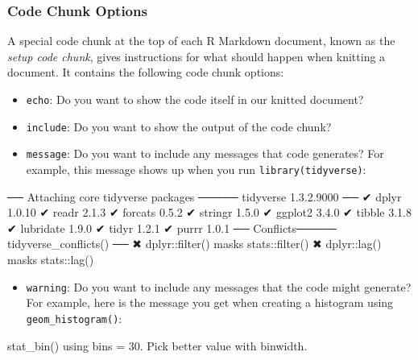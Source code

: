 \documentclass[
]{book}
\newenvironment{Shaded}{\begin{snugshade}}{\end{snugshade}}
\newcommand{\NormalTok}[1]{#1}
\providecommand{\tightlist}{%
  \setlength{\itemsep}{0pt}\setlength{\parskip}{0pt}}
\begin{document}
\hypertarget{code-chunk-options}{%
\subsubsection*{Code Chunk Options}\label{code-chunk-options}}

A special code chunk at the top of each R Markdown document, known as the \emph{setup code chunk}, gives instructions for what should happen when knitting a document. It contains the following code chunk options:

\begin{itemize}
\item
  \texttt{echo}: Do you want to show the code itself in our knitted document?
\item
  \texttt{include}: Do you want to show the output of the code chunk?
\item
  \texttt{message}: Do you want to include any messages that code generates? For example, this message shows up when you run \texttt{library(tidyverse)}:
\end{itemize}

\begin{Shaded}
\begin{Highlighting}[]
\NormalTok{── Attaching core tidyverse packages ───── tidyverse 1.3.2.9000 ──}
\NormalTok{✔ dplyr     1.0.10     ✔ readr     2.1.3 }
\NormalTok{✔ forcats   0.5.2      ✔ stringr   1.5.0 }
\NormalTok{✔ ggplot2   3.4.0      ✔ tibble    3.1.8 }
\NormalTok{✔ lubridate 1.9.0      ✔ tidyr     1.2.1 }
\NormalTok{✔ purrr     1.0.1      }
\NormalTok{── Conflicts───── tidyverse\_conflicts() ──}
\NormalTok{✖ dplyr::filter() masks stats::filter()}
\NormalTok{✖ dplyr::lag()    masks stats::lag()}
\end{Highlighting}
\end{Shaded}

\begin{itemize}
\tightlist
\item
  \texttt{warning}: Do you want to include any messages that the code might generate? For example, here is the message you get when creating a histogram using \texttt{geom\_histogram()}:
\end{itemize}

\begin{Shaded}
\begin{Highlighting}[]
\NormalTok{\textasciigrave{}stat\_bin()\textasciigrave{} using \textasciigrave{}bins = 30\textasciigrave{}. Pick better value with \textasciigrave{}binwidth\textasciigrave{}.}
\end{Highlighting}
\end{Shaded}
\end{document}
